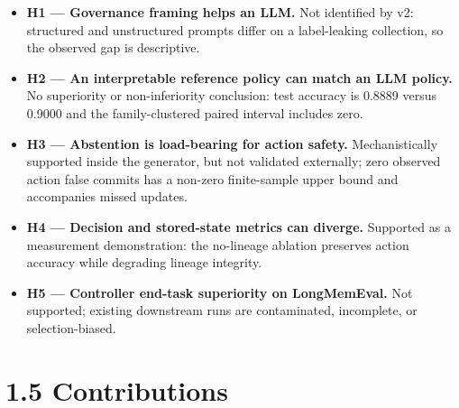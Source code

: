\begin{itemize}
\tightlist
\item
  \textbf{H1 --- Governance framing helps an LLM.} Not identified by v2:
  structured and unstructured prompts differ on a label-leaking
  collection, so the observed gap is descriptive.
\item
  \textbf{H2 --- An interpretable reference policy can match an LLM
  policy.} No superiority or non-inferiority conclusion: test accuracy
  is 0.8889 versus 0.9000 and the family-clustered paired interval
  includes zero.
\item
  \textbf{H3 --- Abstention is load-bearing for action safety.}
  Mechanistically supported inside the generator, but not validated
  externally; zero observed action false commits has a non-zero
  finite-sample upper bound and accompanies missed updates.
\item
  \textbf{H4 --- Decision and stored-state metrics can diverge.}
  Supported as a measurement demonstration: the no-lineage ablation
  preserves action accuracy while degrading lineage integrity.
\item
  \textbf{H5 --- Controller end-task superiority on LongMemEval.} Not
  supported; existing downstream runs are contaminated, incomplete, or
  selection-biased.
\end{itemize}

\section{1.5 Contributions}\label{contributions}


